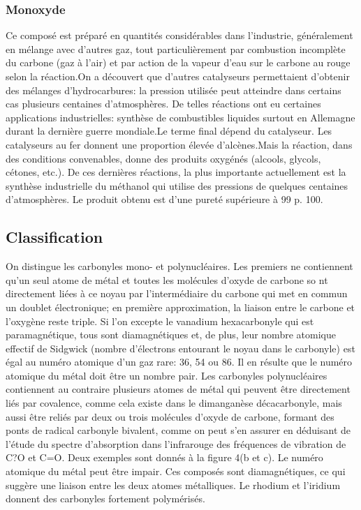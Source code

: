\documentclass[a4 paper, 10 pt]{article}
\begin{document}
\subsubsection{Monoxyde} 

Ce composé est préparé en quantités considérables dans
l'industrie, généralement en mélange avec d'autres gaz, tout
particulièrement par combustion incomplète du carbone (gaz à
l'air) et par action de la vapeur d'eau sur le carbone au rouge selon
la réaction.On a découvert que d'autres catalyseurs permettaient
d'obtenir des mélanges d'hydrocarbures: la pression utilisée
peut atteindre dans certains cas plusieurs centaines
d'atmosphères. De telles réactions ont eu certaines applications
industrielles: synthèse de combustibles liquides surtout en
Allemagne durant la dernière guerre mondiale.Le terme final
dépend du catalyseur. Les catalyseurs au fer donnent une proportion
élevée d'alcènes.Mais la réaction, dans des conditions
convenables, donne des produits oxygénés (alcools, glycols,
cétones, etc.). De ces dernières réactions, la plus
importante actuellement est la synthèse industrielle du méthanol
qui utilise des pressions de quelques centaines d'atmosphères. Le
produit obtenu est d'une pureté supérieure à 99 p. 100.

\subsection{Classification} 

On distingue les carbonyles mono- et polynucléaires. Les premiers
ne contiennent qu'un seul atome de métal et toutes les molécules
d'oxyde de carbone so
nt directement liées à ce noyau par
l'intermédiaire du carbone qui met en commun un doublet
électronique; en première approximation, la liaison entre le
carbone et l'oxygène reste triple. Si l'on excepte le vanadium
hexacarbonyle qui est paramagnétique, tous sont diamagnétiques
et, de plus, leur nombre atomique effectif de Sidgwick (nombre
d'électrons entourant le noyau dans le carbonyle) est égal au
numéro atomique d'un gaz rare: 36, 54 ou 86. Il en résulte que
le numéro atomique du métal doit être un nombre pair. Les
carbonyles polynucléaires contiennent au contraire plusieurs atomes
de métal qui peuvent être directement liés par covalence,
comme cela existe dans le dimanganèse décacarbonyle, mais aussi
être reliés par deux ou trois molécules d'oxyde de carbone,
formant des ponts de radical carbonyle bivalent, comme on peut s'en
assurer en déduisant de l'étude du spectre d'absorption dans
l'infrarouge des fréquences de vibration de C?O et C=O. Deux
exemples sont donnés à la figure 4(b et c). Le numéro
atomique du métal peut être impair. Ces composés sont
diamagnétiques, ce qui suggère une liaison entre les deux atomes
métalliques. Le rhodium et l'iridium donnent des carbonyles
fortement polymérisés.
\end{document}
